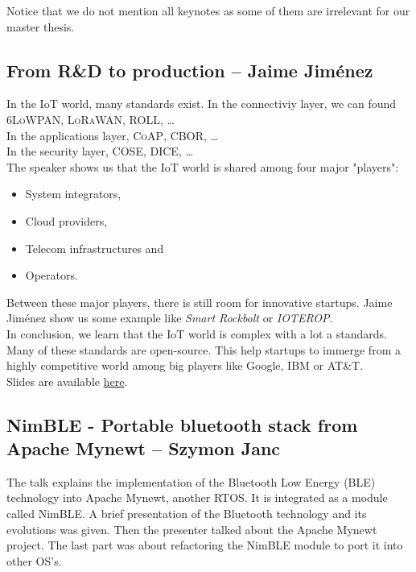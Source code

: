 \documentclass[journal, a4paper]{../IEEEtran}
\begin{document}
Notice that we do not mention all keynotes as some of them are irrelevant for our master thesis.

\subsection{From R\&D to production -- Jaime Jiménez}
In the IoT world, many standards exist. In the connectiviy layer, we can found \textsc{6LoWPAN}, \textsc{LoRaWAN}, \textsc{ROLL}, \dots \\
In the applications layer, \textsc{CoAP}, \textsc{CBOR}, \dots \\ 
In the security layer, \textsc{COSE}, \textsc{DICE}, \dots \\

The speaker shows us that the IoT world is shared among four major "players":
\begin{itemize}
    \item System integrators,
    \item Cloud providers,
    \item Telecom infrastructures and
    \item Operators.
\end{itemize}

Between these major players, there is still room for innovative startups. Jaime Jiménez show us some example like \textit{Smart Rockbolt} or \textit{IOTEROP}. \\

In conclusion, we learn that the IoT world is complex with a lot a standards. 
Many of these standards are open-source.
This help startups to immerge from a highly competitive world among big players like Google, IBM or AT\&T. \\

Slides are available \href{http://summit.riot-os.org/2018/wp-content/uploads/sites/10/2018/09/0_3-Jaime-Jimenez-Keynote.pdf}{here}.

\subsection{NimBLE - Portable bluetooth stack from Apache Mynewt -- Szymon Janc}

The talk explains the implementation of the Bluetooth Low Energy (BLE) technology into Apache Mynewt, another RTOS.
It is integrated as a module called NimBLE.
A brief presentation of the Bluetooth technology and its evolutions was given.
Then the presenter talked about the Apache Mynewt project.
The last part was about refactoring the NimBLE module to port it into other OS's.\\
\end{document}
